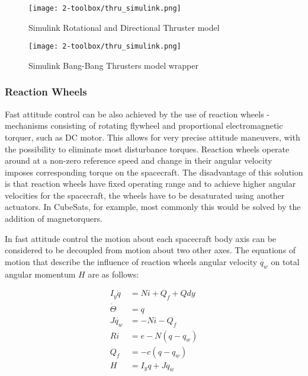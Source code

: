 

        \begin{figure}[H]
            \centering
            \texttt{[image: 2-toolbox/thru\_simulink.png]}
            \caption{Simulink Rotational and Directional Thruster model}
            \label{fig:thru_simulink}
        \end{figure}

        \begin{figure}[H]
            \centering
            \texttt{[image: 2-toolbox/thru\_simulink.png]}
            \caption{Simulink Bang-Bang Thrusters model wrapper}
            \label{fig:bang_bang_simulink}
        \end{figure}

    \subsubsection{Reaction Wheels}
        
        Fast attitude control can be also achieved by the use of reaction wheels - mechanisms consisting of rotating flywheel and proportional electromagnetic torquer, such as DC motor. This allows for very precise attitude maneuvers, with the possibility to eliminate most disturbance torques. Reaction wheels operate around at a non-zero reference speed and change in their angular velocity imposes corresponding torque on the spacecraft. The disadvantage of this solution is that reaction wheels have fixed operating range and to achieve higher angular velocities for the spacecraft, the wheels have to be desaturated using another actuators. In CubeSats, for example, most commonly this would be solved by the addition of magnetorquers.

        In fast attitude control the motion about each spacecraft body axis can be considered to be decoupled from motion about two other axes. The equations of motion that describe the influence of reaction wheels angular velocity $\dot{q_w}$ on total angular momentum $H$ are as follows:
        
        \begin{align}
            I_y\dot{q} &= Ni+Q_f+Qdy\\
            \dot{\Theta} &= q\\
            J\dot{q_w} &= -Ni-Q_f\\
            Ri &= e - N(q-q_w)\\
            Q_f &= -c(q-q_w)\\
            H &= I_yq + Jq_w
        \end{align}


